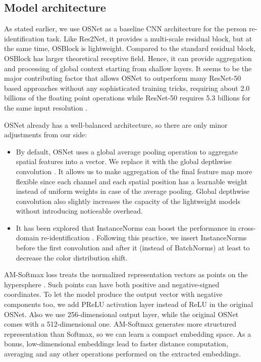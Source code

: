\documentclass[a4paper,conference]{IEEEtran}
\begin{document}
\subsection{Model architecture}

As stated earlier, we use OSNet as a baseline CNN architecture for the person
re-identification task. Like Res2Net, it provides a multi-scale residual block,
but at the same time, OSBlock is lightweight.  Compared to the standard residual
block, OSBlock has larger theoretical receptive field. Hence, it can provide
aggregation and processing of global context starting from shallow layers. It
seems to be the major contributing factor that allows OSNet to outperform many
ResNet-50 based approaches \cite{zhou2019osnet} without any sophisticated
training tricks, requiring about 2.0 billions of the floating point operations
while ResNet-50 requires 5.3 billions for the same input resolution
.

OSNet already has a well-balanced architecture, so there are only minor
adjustments from our side:

\begin{itemize}
  \item By default, OSNet uses a global average pooling operation to aggregate
    spatial features into a vector. We replace it with the global depthwise
    convolution \cite{mobilefacenet}.  It allows us to make aggregation of the
    final feature map more flexible since each channel and each spatial position
    has a learnable weight instead of uniform weights in case of the average
    pooling.  Global depthwise convolution also slightly increases the capacity
    of the lightweight models without introducing noticeable overhead.

  \item It has been explored that InstanceNorms can boost the performance in
    cross-domain re-identification \cite{Jia2019FrustratinglyEP}. Following this
    practice, we insert InstanceNorms before the first convolution and after it
    (instead of BatchNorms) at least to decrease the color distribution shift.

\end{itemize}

AM-Softmax loss treats the normalized representation vectors  as points on
the hypersphere . Such points can have both positive and
negative-signed coordinates.  To let the model produce the output vector with
negative components too, we add PReLU activation layer instead of ReLU in the
original OSNet. Also we use 256-dimensional output layer, while the original
OSNet comes with a 512-dimensional one. AM-Softmax generates more structured
representation than Softmax, so we can learn a compact embedding space. As a
bonus, low-dimensional embeddings lead to faster distance computation, averaging
and any other operations performed on the extracted embeddings.
\end{document}
